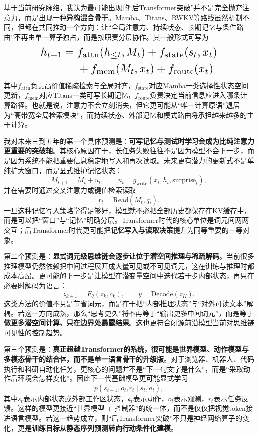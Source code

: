 \documentclass[12pt,a4paper]{article}
\begin{document}
基于当前研究脉络，我认为最可能出现的“后Transformer突破”并不是完全抛弃注意力，而是出现一种\textbf{异构混合骨干}。Mamba、Titans、RWKV等路线虽然机制不同，但都在共同推动一个方向：让“全局注意力、持续状态、长期记忆与条件路由”不再由单一算子独占，而是按职责分层协作。其一般形式可写为
\[
\resizebox{0.74\linewidth}{!}{$
\begin{aligned}
h_{t+1}
=\;& f_{\text{attn}}(h_{\le t}, M_t)
+ f_{\text{state}}(s_t, x_t) \\
&+ f_{\text{mem}}(M_t, x_t)
+ f_{\text{route}}(x_t)
\end{aligned}
$}
\]
其中$f_{\text{attn}}$负责高价值稀疏检索与全局对齐，$f_{\text{state}}$对应Mamba一类选择性状态空间更新，$f_{\text{mem}}$对应Titans一类可写长期记忆，$f_{\text{route}}$负责决定当前信息应进入哪条计算路径。也就是说，注意力不会立刻消失，但它更可能从“唯一计算原语”退居为“高带宽全局检索模块”，而持续状态、外部记忆和模式路由将承担越来越多的主干计算。

我对未来三到五年的第一个具体预测是：\textbf{可写记忆与测试时学习会成为比纯注意力更重要的突破轴}。其核心原因在于，长任务失败往往不是因为模型不会下一步，而是因为系统不能把重要信息稳定地写入和再次读取。未来更有潜力的更新式不是单纯扩大窗口，而是显式维护记忆状态：
\begin{equation}
M_{t+1} = M_t + u_t,\qquad
u_t = g_{\text{write}}(x_t, h_t, \text{surprise}_t),
\end{equation}
并在需要时通过交叉注意力或键值检索读取
\begin{equation}
r_t = \text{Read}(M_t, q_t).
\end{equation}
一旦这种记忆写入策略学得足够好，模型就不必把全部历史都保存在KV缓存中，而是可以把“窗口”与“记忆”明确分层。Transformer时代的核心单位是词元间两两交互；后Transformer时代更可能把\textbf{记忆写入与读取决策}提升为同等重要的一等对象。

第二个预测是：\textbf{显式词元级思维链会逐步让位于潜空间推理与稀疏解码}。当前很多推理模型仍然依赖把中间过程展开成大量可见或不可见词元，这在训练与推理时都成本高昂。更可能的下一步是让模型在潜变量空间中迭代若干步内部状态，再只在必要时解码为语言：
\begin{equation}
z_{k+1} = F_\theta(z_k, c_k), \qquad
y = \text{Decode}(z_K).
\end{equation}
这类方法的价值不只是节省词元，而是在于把“内部推理状态”与“对外可读文本”解耦。若这一方向成熟，那么“思考更久”将不再等于“输出更多中间词元”，而是等于\textbf{做更多潜空间计算、只在边界处暴露结果}。这也更符合闭源前沿模型当前对思维链可见性的控制趋势。

第三个预测是：\textbf{真正超越Transformer的系统，很可能是世界模型、动作模型与多模态骨干的结合体，而不是单一语言骨干的升级版}。对于浏览器、机器人、代码执行和科研自动化任务，更核心的问题并不是“下一句文字是什么”，而是“采取动作后环境会怎样变化”。因此下一代基础模型更可能显式学习
\begin{equation}
p(s_{t+1}, o_t, r_t \mid s_t, a_t),
\end{equation}
其中$s_t$表示内部状态或外部工作区状态，$a_t$表示动作，$o_t$表示观测，$r_t$表示任务反馈。这样的模型更接近“世界模型 + 控制器”的统一体，而不是仅仅把视觉token接进语言模型。若这一趋势成立，则“后Transformer突破”不只是神经网络算子的变化，更是\textbf{训练目标从静态序列预测转向行动条件化建模}。
\end{document}
